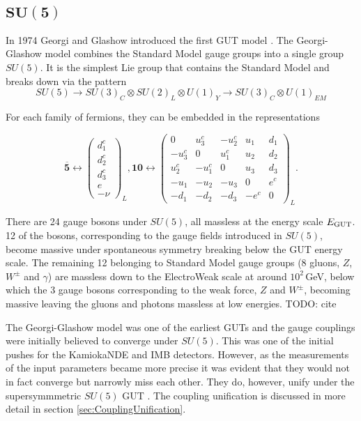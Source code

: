 \documentclass{article}
\begin{document}
\subsection{$\bm{SU(5)}$}%
\label{sec:GUT_SU5}
In 1974 Georgi and Glashow introduced the first GUT model \cite{SU5GeorgiGlashow}.
The Georgi-Glashow model combines the Standard Model gauge groups into a single group $SU(5)$. It is the simplest Lie group that contains the Standard Model and breaks down via the pattern
\begin{equation}
SU(5)\rightarrow SU(3)_C \otimes SU(2)_L \otimes U(1)_Y \rightarrow SU(3)_C \otimes U(1)_{EM}
\end{equation}

For each family of fermions, they can be embedded in the representations 

\begin{equation}
\overline{\bm{5}} \leftrightarrow\left(
\begin{matrix}
    d_{1}^{c} \\
    d_{2}^{c} \\
    d_{3}^{c} \\
    e\\
    -\nu
\end{matrix}\right)_L,
\bm{10}\leftrightarrow\left(
\begin{matrix}
0 & u_{3}^{c} & -u_{2}^{c} & u_{1} & d_{1} \\
-u_{3}^{c} & 0 & u_{1}^{c} & u_{2} & d_{2} \\
u_{2}^{c} & -u_{1}^{c} & 0 & u_{3} & d_{3} \\
-u_1 & -u_2 & -u_3 & 0    & e^c    \\
-d_1 & -d_2 & -d_3 & -e^c & 0
\end{matrix}\right)_L.
\end{equation}

There are 24 gauge bosons under $SU(5)$, all massless at the energy scale $E_{\rm{GUT}}$. 12 of the bosons, corresponding to the gauge fields introduced in $SU(5)$, become massive under spontaneous symmetry breaking below the GUT energy scale. The remaining 12 belonging to Standard Model gauge groups (8 gluons, $Z$,$W^{\pm}$ and $\gamma$) are massless down to the ElectroWeak scale at around $10^2\,$GeV, below which the 3 gauge bosons corresponding to the weak force, $Z$ and $W^{\pm}$, becoming massive leaving the gluons and photons massless at low energies. TODO: cite

The Georgi-Glashow model was one of the earliest GUTs and the gauge couplings were initially believed to converge under $SU(5)$. This was one of the initial pushes for the KamiokaNDE and IMB detectors. However, as the measurements of the input parameters became more precise it was evident that they would not in fact converge but narrowly miss each other. They do, however, unify under the supersymmmetric $SU(5)$ GUT \cite{SUSYSU5CouplingUnification}. The coupling unification is discussed in more detail in section \ref{sec:CouplingUnification}.
\end{document}
